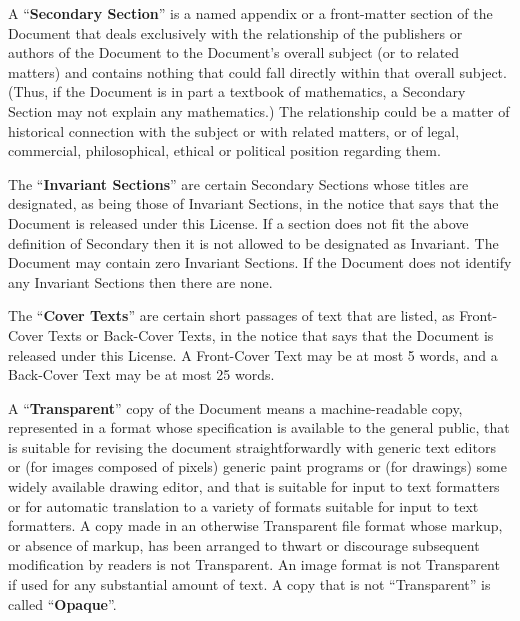\ifdefined\chs

\fi

\ifdefined\eng
A ``\textbf{Secondary Section}'' is a named appendix or a front-matter section of
the Document that deals exclusively with the relationship of the
publishers or authors of the Document to the Document's overall subject
(or to related matters) and contains nothing that could fall directly
within that overall subject.  (Thus, if the Document is in part a
textbook of mathematics, a Secondary Section may not explain any
mathematics.)  The relationship could be a matter of historical
connection with the subject or with related matters, or of legal,
commercial, philosophical, ethical or political position regarding
them.
\fi

\ifdefined\chs

\fi

\ifdefined\eng
The ``\textbf{Invariant Sections}'' are certain Secondary Sections whose titles
are designated, as being those of Invariant Sections, in the notice
that says that the Document is released under this License.  If a
section does not fit the above definition of Secondary then it is not
allowed to be designated as Invariant.  The Document may contain zero
Invariant Sections.  If the Document does not identify any Invariant
Sections then there are none.
\fi

\ifdefined\chs

\fi

\ifdefined\eng
The ``\textbf{Cover Texts}'' are certain short passages of text that are listed,
as Front-Cover Texts or Back-Cover Texts, in the notice that says that
the Document is released under this License.  A Front-Cover Text may
be at most 5 words, and a Back-Cover Text may be at most 25 words.
\fi

\ifdefined\chs

\fi

\ifdefined\eng
A ``\textbf{Transparent}'' copy of the Document means a machine-readable copy,
represented in a format whose specification is available to the
general public, that is suitable for revising the document
straightforwardly with generic text editors or (for images composed of
pixels) generic paint programs or (for drawings) some widely available
drawing editor, and that is suitable for input to text formatters or
for automatic translation to a variety of formats suitable for input
to text formatters.  A copy made in an otherwise Transparent file
format whose markup, or absence of markup, has been arranged to thwart
or discourage subsequent modification by readers is not Transparent.
An image format is not Transparent if used for any substantial amount
of text.  A copy that is not ``Transparent'' is called ``\textbf{Opaque}''.
\fi

